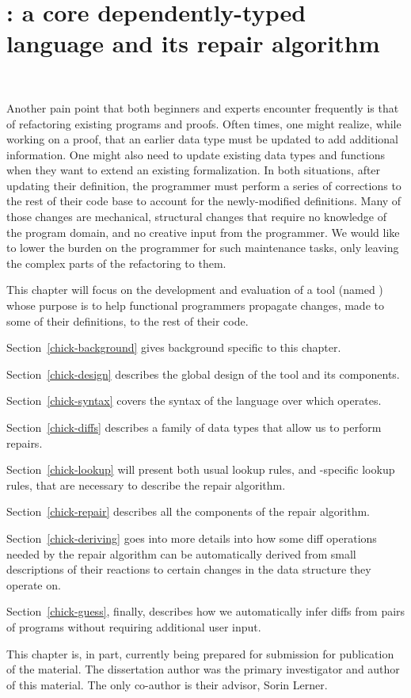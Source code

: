 \chapter{\Chick{}: a core dependently-typed language and its repair
algorithm}~\label{chick}

Another pain point that both beginners and experts encounter frequently is that
of refactoring existing programs and proofs.  Often times, one might realize,
while working on a proof, that an earlier data type must be updated to add
additional information.  One might also need to update existing data types and
functions when they want to extend an existing formalization.  In both
situations, after updating their definition, the programmer must perform a
series of corrections to the rest of their code base to account for the
newly-modified definitions.  Many of those changes are mechanical, structural
changes that require no knowledge of the program domain, and no creative input
from the programmer.  We would like to lower the burden on the programmer for
such maintenance tasks, only leaving the complex parts of the refactoring to
them.

This chapter will focus on the development and evaluation of a tool (named
\Chick{}\footnotemark{}) whose purpose is to help functional programmers
propagate changes, made to some of their definitions, to the rest of their code.


Section~\ref{chick-background} gives background specific to this chapter.

Section~\ref{chick-design} describes the global design of the tool and its
components.

Section~\ref{chick-syntax} covers the syntax of the language over which \Chick{}
operates.

Section~\ref{chick-diffs} describes a family of data types that allow us to
perform repairs.

Section~\ref{chick-lookup} will present both usual lookup rules, and
\Chick{}-specific lookup rules, that are necessary to describe the repair
algorithm.

Section~\ref{chick-repair} describes all the components of the repair algorithm.

Section~\ref{chick-deriving} goes into more details into how some diff
operations needed by the repair algorithm can be automatically derived from
small descriptions of their reactions to certain changes in the data structure
they operate on.

Section~\ref{chick-guess}, finally, describes how we automatically infer diffs
from pairs of programs without requiring additional user input.










This chapter is, in part, currently being prepared for submission for
publication of the material.  The dissertation author was the primary
investigator and author of this material.  The only co-author is their advisor,
Sorin Lerner.
